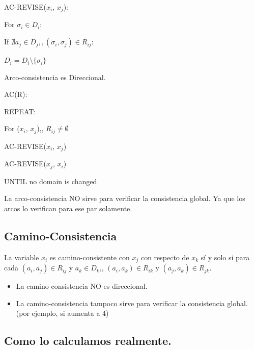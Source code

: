 \documentclass[12pt, twoside, openright]{report} %
\begin{document}
AC-REVISE($x_i$, $x_j$):

\hspace{0.6cm} For $\sigma_i \in D_i$:

\hspace{1.2cm} If $\nexists a_j \in D_j ,, (\sigma_i, \sigma_j) \in R_{ij}$:

\hspace{1.8cm} $D_i = D_i \setminus \{ \sigma_i \}$

Arco-consistencia es Direccional.

AC(R):

\hspace{0.6cm} REPEAT:

\hspace{1.2cm} For ($x_i$, $x_j$),, $R_{ij} \neq \emptyset$

\hspace{1.8cm} AC-REVISE($x_i$, $x_j$)

\hspace{1.8cm} AC-REVISE($x_j$, $x_i$)

\hspace{0.6cm} UNTIL no domain is changed

	La arco-consistencia NO sirve para verificar la consistencia global.
    Ya que los arcos lo verifican para ese par solamente.


	
\subsection{Camino-Consistencia}


    La variable \(x_i\) es camino-consistente con \(x_j\) con respecto
    de \(x_k\) sí y solo si para cada \((a_i,a_j) \in R_{ij}\) y
    \(a_k \in D_k\),, \((a_i,a_k) \in R_{ik}\) y
    \((a_j,a_k) \in R_{jk}\).

    \begin{itemize}
    \item
      La camino-consistencia NO es direccional.

	
    \item
      La camino-consistencia tampoco sirve para verificar la
      consistencia global. (por ejemplo, si aumenta a 4)
	  
    \end{itemize}
\pagebreak
\subsection{Como lo calculamos realmente.}
\end{document}
